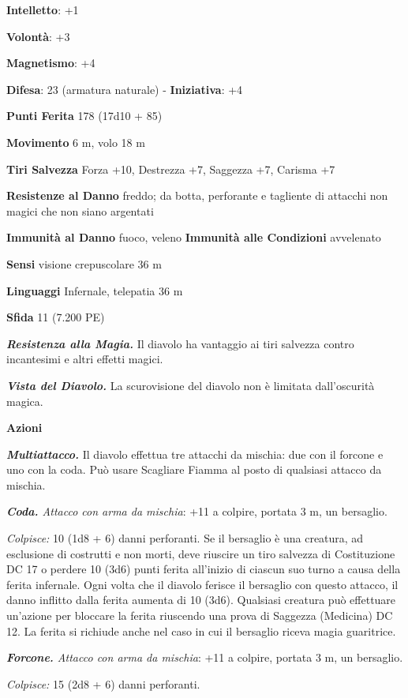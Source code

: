 \begin{multicols}{2}
\textbf{Intelletto}: +1

\textbf{Volontà}: +3

\textbf{Magnetismo}: +4

\textbf{Difesa}: 23 (armatura naturale) - \textbf{Iniziativa}: +4

\textbf{Punti Ferita} 178 (17d10 + 85)

\textbf{Movimento} 6 m, volo 18 m

\textbf{Tiri Salvezza} Forza +10, Destrezza +7, Saggezza +7, Carisma +7

\textbf{Resistenze al Danno} freddo; da botta, perforante e tagliente
di attacchi non magici che non siano argentati

\textbf{Immunità al Danno} fuoco, veleno \textbf{Immunità alle
Condizioni} avvelenato

\textbf{Sensi} visione crepuscolare 36 m

\textbf{Linguaggi} Infernale, telepatia 36 m 

\textbf{Sfida} 11 (7.200 PE)\smallskip

\emph{\textbf{Resistenza alla Magia.}} Il diavolo ha vantaggio ai tiri
salvezza contro incantesimi e altri effetti magici.

\emph{\textbf{Vista del Diavolo.}} La scurovisione del diavolo non è
limitata dall'oscurità magica.

\smallskip\textbf{Azioni}

\emph{\textbf{Multiattacco.}} Il diavolo effettua tre attacchi da
mischia: due con il forcone e uno con la coda. Può usare Scagliare
Fiamma al posto di qualsiasi attacco da mischia.

\emph{\textbf{Coda.} Attacco con arma da mischia}: +11 a colpire,
portata 3 m, un bersaglio.

\emph{Colpisce:} 10 (1d8 + 6) danni perforanti. Se il bersaglio è una
creatura, ad esclusione di costrutti e non morti, deve riuscire un tiro
salvezza di Costituzione DC 17 o perdere 10 (3d6) punti ferita
all'inizio di ciascun suo turno a causa della ferita infernale. Ogni
volta che il diavolo ferisce il bersaglio con questo attacco, il danno
inflitto dalla ferita aumenta di 10 (3d6). Qualsiasi creatura può
effettuare un'azione per bloccare la ferita riuscendo una prova di
Saggezza (Medicina) DC 12. La ferita si richiude anche nel caso in cui
il bersaglio riceva magia guaritrice.

\emph{\textbf{Forcone.} Attacco con arma da mischia}: +11 a colpire,
portata 3 m, un bersaglio.

\emph{Colpisce:} 15 (2d8 + 6) danni perforanti.


\end{multicols}

